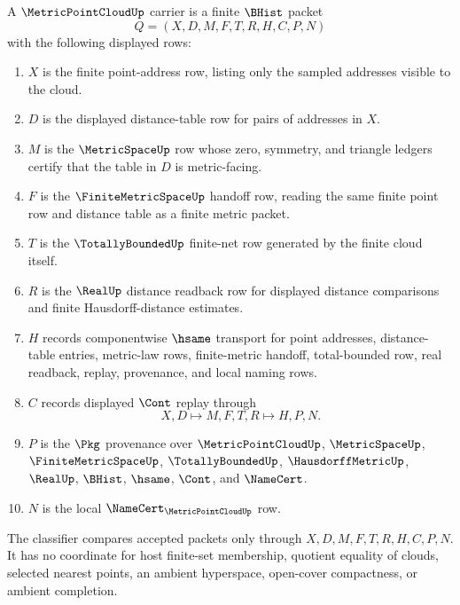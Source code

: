 \begin{definition}
\label{def:metric-point-cloud-carrier}
A $\MetricPointCloudUp$ carrier is a finite $\BHist$ packet
$$
Q=(X,D,M,F,T,R,H,C,P,N)
$$
with the following displayed rows:
\begin{enumerate}
\item $X$ is the finite point-address row, listing only the sampled addresses visible to the cloud.
\item $D$ is the displayed distance-table row for pairs of addresses in $X$.
\item $M$ is the $\MetricSpaceUp$ row whose zero, symmetry, and triangle ledgers certify that the table in $D$ is metric-facing.
\item $F$ is the $\FiniteMetricSpaceUp$ handoff row, reading the same finite point row and distance table as a finite metric packet.
\item $T$ is the $\TotallyBoundedUp$ finite-net row generated by the finite cloud itself.
\item $R$ is the $\RealUp$ distance readback row for displayed distance comparisons and finite Hausdorff-distance estimates.
\item $H$ records componentwise $\hsame$ transport for point addresses, distance-table entries, metric-law rows, finite-metric handoff, total-bounded row, real readback, replay, provenance, and local naming rows.
\item $C$ records displayed $\Cont$ replay through
$$
X,D \longmapsto M,F,T,R \longmapsto H,P,N .
$$
\item $P$ is the $\Pkg$ provenance over $\MetricPointCloudUp$, $\MetricSpaceUp$, $\FiniteMetricSpaceUp$, $\TotallyBoundedUp$, $\HausdorffMetricUp$, $\RealUp$, $\BHist$, $\hsame$, $\Cont$, and $\NameCert$.
\item $N$ is the local $\NameCert_{\MetricPointCloudUp}$ row.
\end{enumerate}
The classifier compares accepted packets only through $X,D,M,F,T,R,H,C,P,N$. It has no coordinate for host finite-set membership, quotient equality of clouds, selected nearest points, an ambient hyperspace, open-cover compactness, or ambient completion.
\end{definition}

